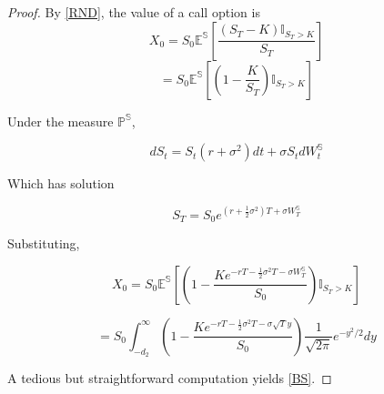 \documentclass{article}
\begin{document}
\begin{proof}
	By \ref{RND}, the value of a call option is 
	\[X_0=S_0 \mathbb{E^S}\left[\frac{ (S_T-K) \mathbb{I}_{S_T>K} }{S_T} \right] \]
	\[= S_0    \mathbb{E^S}\left[ \left(1-\frac{K}{S_T} \right) \mathbb{I}_{S_T>K} \right] \]
	
	Under the measure \(\mathbb{P^S}\), 
	
	\[dS_t=S_t \left(r+\sigma^2\right)dt +\sigma S_t dW^\mathbb{S}_t \]
	
	Which has solution
	
	\[ S_T=S_0 e^{ \left(r+ \frac{1}{2} \sigma^2 \right)T +\sigma W^\mathbb{S}_T }  \]
	
	Substituting,
	
	\[X_0 = S_0  \mathbb{E^S}\left[ \left(1-\frac{K e^{-rT -\frac{1}{2} \sigma^2 T - \sigma W^\mathbb{S}_T}}{S_0} \right) \mathbb{I}_{S_T>K} \right] \]
	
	\[ = S_0 \int_{-d_2}^\infty \left( 1-\frac{K e^{-rT -\frac{1}{2} \sigma^2 T - \sigma \sqrt{T} y } }{S_0} \right) \frac{1}{\sqrt{2\pi}} e^{-y^2 /2 } dy \]
	
	A tedious but straightforward computation yields \ref{BS}.
	
\end{proof}
\end{document}
